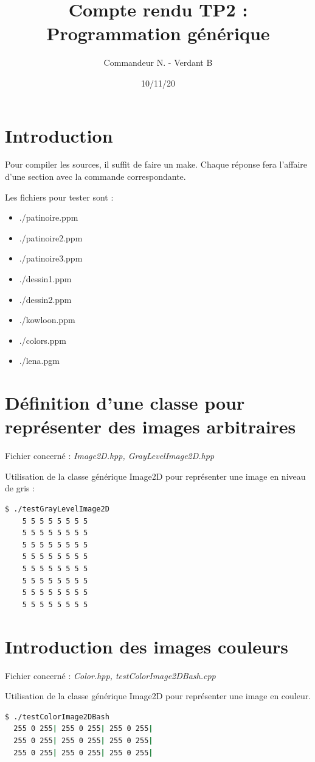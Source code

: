 \documentclass[a4paper,10pt]{article}
\title{Compte rendu TP2 : Programmation générique}
\date{10/11/20}
\author{Commandeur N. - Verdant B}
\begin{document}
\maketitle
{}
\newpage
\tableofcontents
\newpage
  \section{Introduction}
   Pour compiler les sources, il suffit de faire un make. Chaque réponse fera l'affaire d'une section avec la commande correspondante.
  
  Les fichiers pour tester sont :
  \begin{itemize}
    \item ./patinoire.ppm
    \item ./patinoire2.ppm
    \item ./patinoire3.ppm
    \item ./dessin1.ppm
    \item ./dessin2.ppm
    \item ./kowloon.ppm
    \item ./colors.ppm
    \item ./lena.pgm

  \end{itemize}


  \section{Définition d'une classe pour représenter des images arbitraires}
  Fichier concerné : \emph{Image2D.hpp, GrayLevelImage2D.hpp}

  Utilisation de la classe générique Image2D pour représenter une image en niveau de gris :
  \begin{lstlisting}[language=Bash]
  $ ./testGrayLevelImage2D  
    5 5 5 5 5 5 5 5
    5 5 5 5 5 5 5 5
    5 5 5 5 5 5 5 5
    5 5 5 5 5 5 5 5
    5 5 5 5 5 5 5 5
    5 5 5 5 5 5 5 5
    5 5 5 5 5 5 5 5
    5 5 5 5 5 5 5 5
  \end{lstlisting}
  \section{Introduction des images couleurs}
  Fichier concerné : \emph{Color.hpp, testColorImage2DBash.cpp}

  Utilisation de la classe générique Image2D pour représenter une image en couleur.
  \begin{lstlisting}[language=Bash]
  $ ./testColorImage2DBash
  255 0 255| 255 0 255| 255 0 255| 
  255 0 255| 255 0 255| 255 0 255| 
  255 0 255| 255 0 255| 255 0 255| 
  \end{lstlisting}
    \pagebreak
\end{document}
